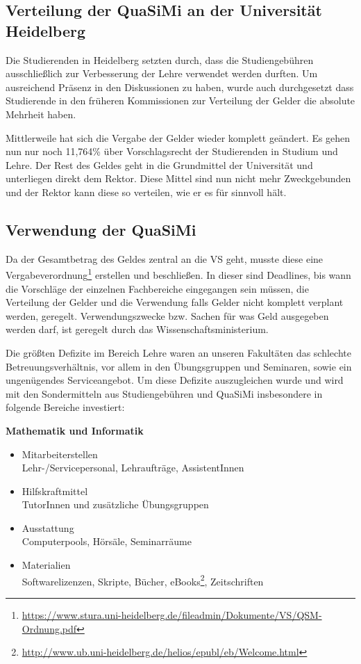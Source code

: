 \subsection*{Verteilung der QuaSiMi an der Universität Heidelberg}

Die Studierenden in Heidelberg setzten durch, dass die Studiengebühren ausschließlich zur Verbesserung der Lehre verwendet werden durften. Um ausreichend Präsenz in den Diskussionen zu haben, wurde auch durchgesetzt dass Studierende in den früheren Kommissionen zur Verteilung der Gelder die absolute Mehrheit haben. 

Mittlerweile hat sich die Vergabe der Gelder wieder komplett geändert. Es gehen nun nur noch 11,764\% über Vorschlagsrecht der Studierenden in Studium und Lehre. Der Rest des Geldes geht in die Grundmittel der Universität und unterliegen direkt dem Rektor. Diese Mittel sind nun nicht mehr Zweckgebunden und der Rektor kann diese so verteilen, wie er es für sinnvoll hält. 


\subsection*{Verwendung der QuaSiMi}

Da der Gesamtbetrag des Geldes zentral an die VS geht, musste diese eine Vergabeverordnung\footnote{\url{https://www.stura.uni-heidelberg.de/fileadmin/Dokumente/VS/QSM-Ordnung.pdf}} erstellen und beschließen. In dieser sind Deadlines, bis wann die Vorschläge der einzelnen Fachbereiche eingegangen sein müssen, die Verteilung der Gelder und die Verwendung falls Gelder nicht komplett verplant werden, geregelt. Verwendungszwecke bzw. Sachen für was Geld ausgegeben werden darf, ist geregelt durch das Wissenschaftsministerium.

Die größten Defizite im Bereich Lehre waren an unseren Fakultäten das schlechte Betreuungsverhältnis, vor allem in den Übungsgruppen und Seminaren, sowie ein ungenügendes Serviceangebot. Um diese Defizite auszugleichen wurde und wird mit den Sondermitteln aus Studiengebühren und QuaSiMi insbesondere in folgende Bereiche investiert:

\vspace{5mm}
\textbf{Mathematik und Informatik}
\begin{itemize}
 \item {Mitarbeiterstellen}\\Lehr-/Servicepersonal, Lehraufträge, AssistentInnen
\item {Hilfskraftmittel}\\ TutorInnen und zusätzliche Übungsgruppen
\item {Ausstattung}\\ Computerpools, Hörsäle, Seminarräume
\item {Materialien}\\ Softwarelizenzen, Skripte, Bücher, eBooks\footnote{\url{http://www.ub.uni-heidelberg.de/helios/epubl/eb/Welcome.html}}, Zeitschriften
\end{itemize}

